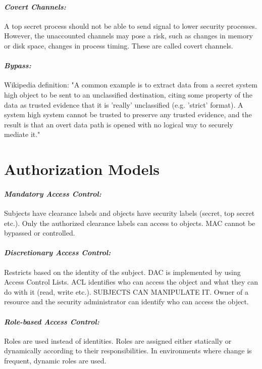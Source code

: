 \documentclass[11pt]{article} %
\begin{document}
\paragraph{\textit{Covert Channels:}} A top secret process should not be able to send signal to lower security processes. However, the unaccounted channels may pose a risk, such as changes in memory or disk space, changes in process timing. These are called covert channels.

\paragraph{\textit{Bypass:}} Wikipedia definition:
			"A common example is to extract data from a secret system high object to be sent to an unclassified destination, citing some property of the data as trusted evidence that it is 'really' unclassified (e.g. 'strict' format). A system high system cannot be trusted to preserve any trusted evidence, and the result is that an overt data path is opened with no logical way to securely mediate it." 


\section{Authorization Models}

\paragraph{\textit{Mandatory Access Control:}} Subjects have clearance labels and objects have security labels (secret, top secret etc.). Only the authorized clearance labels can access to objects. MAC cannot be bypassed or controlled.

\paragraph{\textit{Discretionary Access Control:}} Restricts based on the identity of the subject. DAC is implemented by using Access Control Lists. ACL identifies who can access the object and what they can do with it (read, write etc.). SUBJECTS CAN MANIPULATE IT. Owner of a resource and the security administrator can identify who can access the object.

\paragraph{\textit{Role-based Access Control:}} Roles are used instead of identities. Roles are assigned either statically or dynamically according to their responsibilities. In environments where change is frequent, dynamic roles are used.
\end{document}
